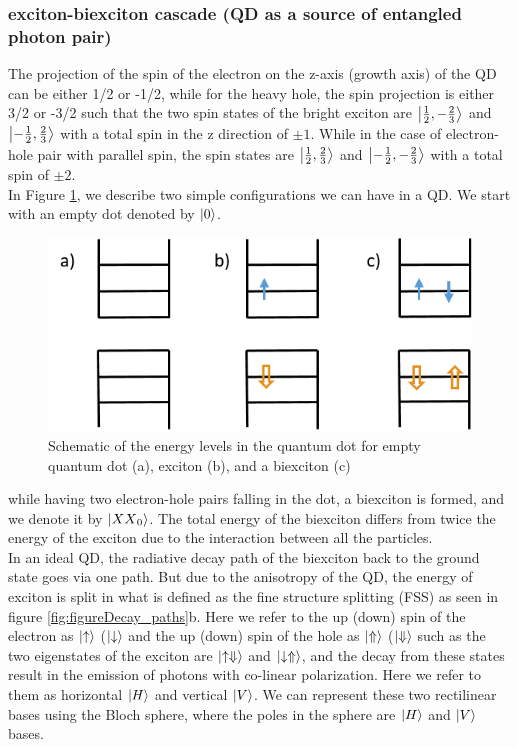 \subsubsection{exciton-biexciton cascade (QD as a source of entangled photon pair)}
The projection of the spin of the electron on the z-axis (growth axis) of the QD can be either 1/2 or -1/2, while for the heavy hole, the spin 
 projection is either 3/2 or -3/2 such that the two spin states of the bright exciton are $\ket{\frac{1}{2},-\frac{2}{3}}$ and $\ket{-\frac{1}
 {2},\frac{2}{3}}$  with a total spin in the z direction  of $\pm1$. While in the case of electron-hole pair with parallel spin, the spin states are $\ket{\frac{1}{2},\frac{2}{3}}$ and $\ket{-\frac{1}{2},-\frac{2}{3}}$ with a total spin of $\pm2$.\\
	In Figure \ref{fig:energy_levels}, we describe two simple configurations we can have in a QD. We start with an empty dot denoted by $\ket{0}$.
	\begin{figure}[H]
		\centering
		\includegraphics[scale=1]{figures/energy-levels.png}
		\caption{Schematic of the energy levels in the quantum dot for empty quantum dot (a), exciton (b), and a biexciton (c)}
		\label{fig:energy_levels}
	\end{figure}
	while having two electron-hole pairs falling in the dot, a biexciton is formed, and we denote it by $\ket{{XX}_0}$. The total energy of the biexciton differs from twice the energy of the exciton due to the interaction between all the particles.\\
	In an ideal QD, the radiative decay path of the biexciton back to the ground state goes via one path. But due to the anisotropy of the QD, the energy of exciton is split in what is defined as the fine structure splitting (FSS) as seen in figure \ref{fig:figureDecay_paths}b. Here we refer to the up (down) spin of the electron as $\ket{\uparrow}$ ($\ket{\downarrow}$ and the up (down) spin of the hole as $\ket{\Uparrow}$ ($\ket{\Downarrow}$ such as the two eigenstates of the exciton are  $\ket{\uparrow\Downarrow}$ and $\ket{\downarrow\Uparrow}$, and the decay from these states result in the emission of photons with co-linear polarization. Here we refer to them as horizontal $\ket{H}$ and vertical $\ket{V}$. We can represent these two rectilinear bases using the Bloch sphere, where the poles in the sphere are $\ket{H}$ and $\ket{V}$ bases.\\
	
